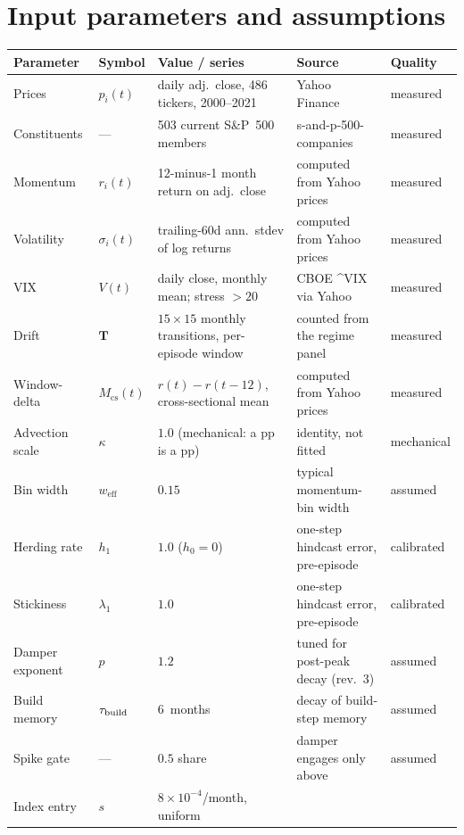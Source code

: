 \documentclass[11pt,a4paper]{article}
\begin{document}
\section{Input parameters and assumptions}
{\footnotesize
\setlength{\tabcolsep}{4pt}
\begin{longtable}{@{}llp{3.6cm}p{2.9cm}p{1.9cm}@{}}
\toprule
Parameter & Symbol & Value / series & Source & Quality \\
\midrule
\endhead
\bottomrule
\endfoot
Prices & $p_i(t)$ & daily adj.\ close, 486 tickers, 2000--2021 &
  Yahoo Finance~\cite{yahoo-finance} & measured \\
Constituents & --- & 503 current S\&P~500 members &
  s-and-p-500-companies~\cite{sp500-list} & measured \\
Momentum & $r_i(t)$ & 12-minus-1 month return on adj.\ close &
  computed from Yahoo prices~\cite{yahoo-finance} & measured \\
Volatility & $\sigma_i(t)$ & trailing-60d ann.\ stdev of log returns &
  computed from Yahoo prices~\cite{yahoo-finance} & measured \\
VIX & $V(t)$ & daily close, monthly mean; stress $>20$ &
  CBOE \^{}VIX via Yahoo~\cite{yahoo-finance} & measured \\
Drift & $\mathbf{T}$ & $15\times15$ monthly transitions, per-episode window &
  counted from the regime panel & measured \\
Window-delta & $M_{\mathrm{cs}}(t)$ & $r(t)-r(t-12)$, cross-sectional mean &
  computed from Yahoo prices~\cite{yahoo-finance} & measured \\
Advection scale & $\kappa$ & $1.0$ (mechanical: a pp is a pp) &
  identity, not fitted & mechanical \\
Bin width & $w_{\mathrm{eff}}$ & $0.15$ &
  typical momentum-bin width & assumed \\
Herding rate & $h_1$ & $1.0$ ($h_0=0$) &
  one-step hindcast error, pre-episode & calibrated \\
Stickiness & $\lambda_1$ & $1.0$ &
  one-step hindcast error, pre-episode & calibrated \\
Damper exponent & $p$ & $1.2$ &
  tuned for post-peak decay (rev.~3) & assumed \\
Build memory & $\tau_{\rm build}$ & $6$~months &
  decay of build-step memory & assumed \\
Spike gate & --- & $0.5$ share &
  damper engages only above & assumed \\
Index entry & $s$ & $8\times10^{-4}$/month, uniform &

\end{longtable}}
\end{document}
